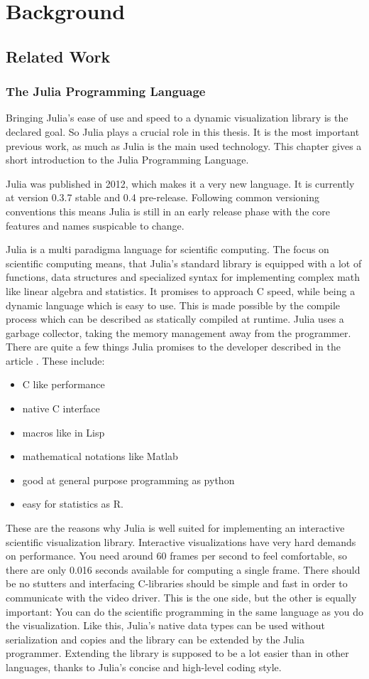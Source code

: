 \section{Background}


\subsection{Related Work}

\subsubsection{The Julia Programming Language}
Bringing Julia's ease of use and speed to a dynamic visualization library is the declared goal.
So Julia plays a crucial role in this thesis. 
It is the most important previous work, as much as Julia is the main used technology.
This chapter gives a short introduction to the Julia Programming Language.

Julia was published in 2012, which makes it a very new language. It is currently at version 0.3.7 stable and 0.4 pre-release.
Following common versioning conventions this means Julia is still in an early release phase with the core features and names suspicable to change.

Julia is a multi paradigma language for scientific computing.
The focus on scientific computing means, that Julia's standard library is equipped with a lot of functions, data structures and specialized syntax for implementing complex math like linear algebra and statistics.
It promises to approach C speed, while being a dynamic language which is easy to use.
This is made possible by the compile process which can be described as statically compiled at runtime.
Julia uses a garbage collector, taking the memory management away from the programmer.
There are quite a few things Julia promises to the developer described in the article \cite{WhyJulia}.
These include:
\begin{itemize}
	\item C like performance
	\item native C interface
	\item macros like in Lisp
	\item mathematical notations like Matlab
	\item good at general purpose programming as python
	\item easy for statistics as R.
\end{itemize}
These are the reasons why Julia is well suited for implementing an interactive scientific visualization library.
Interactive visualizations have very hard demands on performance. 
You need around 60 frames per second to feel comfortable, so there are only 0.016 seconds available for computing a single frame.
There should be no stutters and interfacing C-libraries should be simple and fast in order to communicate with the video driver.
This is the one side, but the other is equally important:
You can do the scientific programming in the same language as you do the visualization.
Like this, Julia's native data types can be used without serialization and copies and the library can be extended by the Julia programmer.
Extending the library is supposed to be a lot easier than in other languages, thanks to Julia's concise and high-level coding style.
